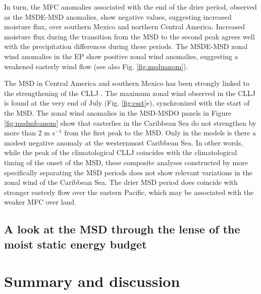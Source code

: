 In turn, the MFC anomalies associated with the end of the drier period, observed as the MSDE-MSD anomalies,  show negative values, suggesting increased moisture flux, over southern Mexico and northern Central America.
Increased moisture flux during the transition from the MSD to the second peak agrees well with the precipitation differences during these periods.  The MSDE-MSD zonal wind anomalies in the EP show positive zonal wind anomalies, suggesting a weakened easterly wind flow (see also Fig. \ref{fig:msduanom}). 

The MSD in Central America and southern Mexico has been strongly linked to the strengthening of the CLLJ \citep{herrera2015}. The maximum zonal wind observed in the CLLJ is found at the very end of July (Fig. \ref{fig:csst}e), synchronized with the start of the MSD. 
The zonal wind anomalies in the MSD-MSDO panels in Figure \ref{fig:msdmfcanom} show that easterlies in the Caribbean Sea do not strengthen by more than 2 m s$^{-1}$ from the first peak to the MSD. Only in the models is there a modest negative anomaly at the westernmost Caribbean Sea. In other words, while the peak of the climatological CLLJ coincides with the climatological timing of the onset of the MSD, these composite analyses constructed by more specifically separating the MSD periods does not show relevant variations in the zonal wind of the Caribbean Sea. 
The drier MSD period does coincide with stronger easterly flow over the eastern Pacific, which may be associated with the weaker MFC over land. %

\subsection{A look at the MSD through the lense of the moist static energy budget}

\section{Summary and discussion}\label{sq:sumdiscuss}


